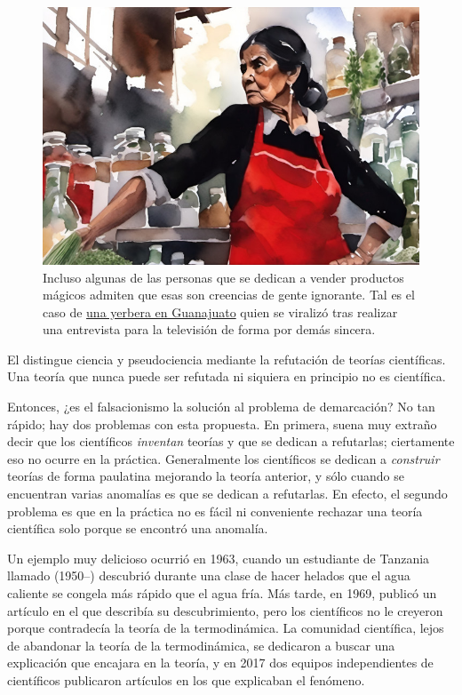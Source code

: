 \begin{figure}[ht]
    \centering
    \includegraphics[width=0.8\linewidth]{img/creenciasdegente}
    \caption{Incluso algunas de las personas que se dedican a vender productos
        mágicos admiten que esas son creencias de gente ignorante.
        Tal es el caso de %
        \href{https://eldeforma.com/2020/04/08/mujer-explota-quedate-en-casa-quien-me-mantiene-huevos-para-curar/}%
        {una yerbera en Guanajuato} quien se viralizó tras
        realizar una entrevista para la televisión de forma por demás
        sincera.}
\end{figure}

\begin{remember}
    \label{rem:falsacionismo}
    El  distingue ciencia y pseudociencia mediante
    la refutación de teorías científicas.
    Una teoría que nunca puede ser refutada ni siquiera en principio no es
    científica.
\end{remember}

Entonces, ¿es el falsacionismo la solución al problema de demarcación?
No tan rápido; hay dos problemas con esta propuesta.
En primera, suena muy extraño decir que los científicos \emph{inventan}
teorías y que se dedican a refutarlas; ciertamente eso no ocurre en la práctica.
Generalmente los científicos se dedican a \emph{construir} teorías de forma
paulatina mejorando la teoría anterior, y sólo cuando se encuentran varias
anomalías es que se dedican a refutarlas.
En efecto, el segundo problema es que en la práctica no es fácil ni conveniente
rechazar una teoría científica solo porque se encontró una anomalía.

Un ejemplo muy delicioso ocurrió en 1963, cuando un estudiante de Tanzania
llamado  (1950--) descubrió durante una
clase de hacer helados que el agua caliente se congela más rápido que el agua
fría.
Más tarde, en 1969, publicó un artículo en el que describía su
descubrimiento\cite{Mpemba1979}, pero los científicos no le creyeron porque
contradecía la teoría de la termodinámica.
La comunidad científica, lejos de abandonar la teoría de la termodinámica, se
dedicaron a buscar una explicación que encajara en la teoría, y en 2017 dos
equipos independientes de científicos publicaron artículos en los que explicaban el
fenómeno.

